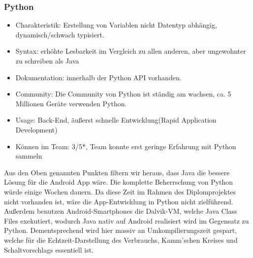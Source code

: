 \subsubsection{Python}
\begin{itemize}
\item Charakteristik: Erstellung von Variablen nicht Datentyp abhängig, dynamisch/schwach typisiert.
\item Syntax: erhöhte Lesbarkeit im Vergleich zu allen anderen, aber ungewohnter zu schreiben als Java
\item Dokumentation: innerhalb der Python API vorhanden.
\item Community: Die Community von Python ist ständig am wachsen, ca. 5 Millionen Geräte verwenden Python.
\item Usage: Back-End, äußerst schnelle Entwicklung(Rapid Application Development)
\item Können im Team: 3/5*, Team konnte erst geringe Erfahrung mit Python sammeln
\end{itemize}

Aus den Oben genannten Punkten filtern wir heraus, dass Java die bessere Lösung für die Android App wäre. 
Die komplette Beherrschung von Python würde einige Wochen dauern. 
Da diese Zeit im Rahmen des Diplomprojektes nicht vorhanden ist, wäre die App-Entwicklung in Python nicht zielführend. 
Außerdem benutzen Android-Smartphones die Dalvik-VM, welche Java Class Files exekutiert, 
wodurch Java nativ auf Android realisiert wird im Gegensatz zu Python. 
Dementsprechend wird hier massiv an Umkompilierungszeit gespart, welche für die Echtzeit-Darstellung des Verbrauchs, 
Kamm'schen Kreises und Schaltvorschlags essentiell ist.
